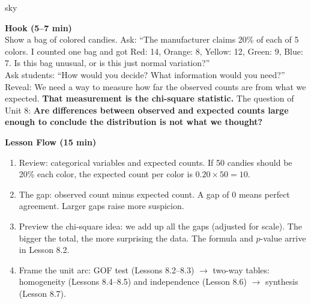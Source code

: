 \documentclass[10pt]{article}
\begin{document}
\begin{skillbox}{sky}
\begin{minipage}[t]{0.48\linewidth}
    \textbf{Hook (5--7 min)}\\
    Show a bag of colored candies. Ask: ``The manufacturer claims 20\% of each of
    5 colors. I counted one bag and got Red: 14, Orange: 8, Yellow: 12, Green: 9,
    Blue: 7. Is this bag unusual, or is this just normal variation?''\\[4pt]
    Ask students: ``How would you decide? What information would you need?''\\[4pt]
    Reveal: We need a way to measure how far the observed counts are from
    what we expected. \textbf{That measurement is the chi-square statistic.}
    The question of Unit 8: \textbf{Are differences between observed and expected
    counts large enough to conclude the distribution is not what we thought?}
\end{minipage}
\hfill
\begin{minipage}[t]{0.48\linewidth}
    \textbf{Lesson Flow (15 min)}
    \begin{enumerate}
        \item Review: categorical variables and expected counts. If 50 candies
              should be 20\% each color, the expected count per color is
              $0.20 \times 50 = 10$.
        \item The gap: observed count minus expected count. A gap of 0 means
              perfect agreement. Larger gaps raise more suspicion.
        \item Preview the chi-square idea: we add up all the gaps (adjusted for
              scale). The bigger the total, the more surprising the data. The
              formula and $p$-value arrive in Lesson 8.2.
        \item Frame the unit arc: GOF test (Lessons 8.2--8.3) $\to$ two-way
              tables: homogeneity (Lessons 8.4--8.5) and independence
              (Lesson 8.6) $\to$ synthesis (Lesson 8.7).
    \end{enumerate}
\end{minipage}
\end{skillbox}
\end{document}
